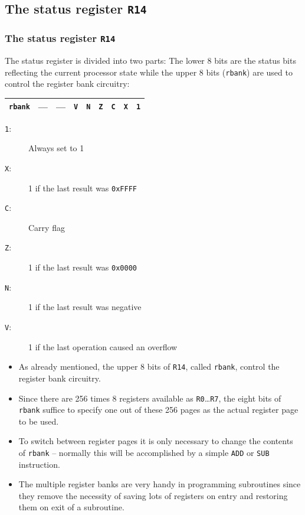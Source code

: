 \documentclass{beamer}
\begin{document}
  \subsection{The status register {\tt R14}}
   \begin{frame}
    \frametitle{The status register {\tt R14}}
    The status register is divided into two parts: The lower
    8 bits are the status bits reflecting the current processor
    state while the upper 8 bits ({\tt rbank}) are used to control 
    the register bank circuitry:
    \begin{center}
     \begin{tabular}{|c||c|c|c|c|c|c|c|c|}
      \hline
       {\tt rbank}&
       ---&---&{\tt V}&{\tt N}&{\tt Z}&{\tt C}&{\tt X}&{\tt 1}\\
      \hline
     \end{tabular}
    \end{center}
    \begin{description}
     \item [{\tt 1}:] Always set to 1
     \item [{\tt X}:] 1 if the last result was {\tt 0xFFFF}
     \item [{\tt C}:] Carry flag
     \item [{\tt Z}:] 1 if the last result was {\tt 0x0000}
     \item [{\tt N}:] 1 if the last result was negative
     \item [{\tt V}:] 1 if the last operation caused an overflow
    \end{description}
   \end{frame}
%
   \begin{frame}
    \begin{itemize}
     \item As already mentioned, the upper 8 bits of {\tt R14}, called
      {\tt rbank}, control the register bank circuitry.
     \item Since there are 256 times 8 registers available as 
      {\tt R0}\dots{\tt R7}, the eight bits of {\tt rbank} suffice to
      specify one out of these 256 pages as the actual register page
      to be used.
     \item To switch between register pages it is only necessary to 
      change the contents of {\tt rbank} -- normally this will be 
      accomplished by a simple {\tt ADD} or {\tt SUB} instruction.
     \item The multiple register banks are very handy in programming
      subroutines since they remove the necessity of saving lots of
      registers on entry and restoring them on exit of a subroutine.
    \end{itemize}
   \end{frame}
%
\end{document}
